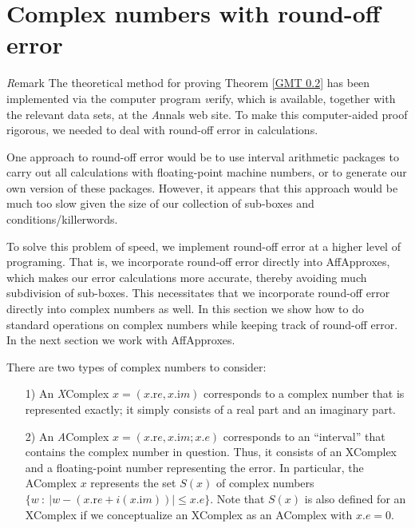 \chapter{Complex numbers with round-off error}


{\textit Remark} \label{GMT 7.1}
The theoretical method for proving Theorem \ref{GMT 0.2}
has been implemented via the computer program {\textit verify}, which is available, together with the relevant data sets, at the {\textit Annals} web site.  To make this computer-aided proof rigorous, we needed to deal with round-off error in calculations.  

One approach to round-off error would be to use interval arithmetic packages to carry out all calculations with floating-point machine numbers, or to generate our own version of these packages.  
However, it appears that this approach
would be much too slow given the size of our collection of sub-boxes and conditions/killerwords.  

To solve this problem of speed, we implement round-off error at a higher level of programing.  That is, we incorporate round-off error directly
 into AffApproxes,  which makes our error calculations more accurate, thereby avoiding much subdivision of
sub-boxes. This necessitates that we incorporate round-off error directly into complex numbers as well. 
In this section we show how to do standard operations on complex numbers while keeping track of round-off error.
In the next section we work with  AffApproxes.

\begin{definition}\label{GMT 7.2}
There are two types of complex numbers to consider: 

\begin{itemize}
\item[1)]  An {\textit XComplex} $x = (x.{\mathrm re}, x.{\mathrm im})$ corresponds to a complex number that is represented exactly; it
simply consists of a real part and an imaginary part.

\item[2)]  An {\textit AComplex} $x = (x.{\mathrm re}, x.{\mathrm im}; x.e)$ corresponds to an ``interval'' that contains the complex number in
question.  Thus, it consists of an XComplex and a floating-point number representing the error.  In particular, the AComplex
$x$ represents the set $S(x)$ of complex numbers 
$\{w\ :\ |w - (x.{\mathrm re} + i (x.{\mathrm im}))| \le x.e\}$.  Note that $S(x)$ is also defined
for an XComplex if we conceptualize an XComplex as an AComplex with
$x.e = 0.$
\end{itemize}

\end{definition}

